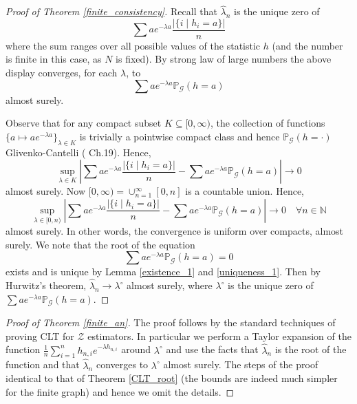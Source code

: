 \documentclass[12pt]{article}
\numberwithin{equation}{section}
\begin{document}
\begin{proof}[Proof of Theorem \ref{finite_consistency}]
Recall that $\hat{\lambda}_n$ is the unique zero of
\[
\sum a e^{-\lambda a}\frac{\lvert\{i\mid h_i=a\}\rvert}{n}
\]
where the sum ranges over all possible values of the statistic $h$ (and the number is finite in this case, as $N$ is fixed). By strong law of large numbers the above display converges, for each $\lambda$, to
\[
\sum a e^{-\lambda a}\mathbb{P}_{\mathcal{G}}(h=a)
\]
almost surely. 

Observe that for any compact subset $K\subseteq [0,\infty)$, the collection of functions $\{a\mapsto a e^{-\lambda a}\}_{\lambda\in K}$ is trivially a pointwise compact class and hence $\mathbb{P}_{\mathcal{G}}(h=\cdot)$ Glivenko-Cantelli (\cite{Vaart1998} Ch.19). Hence,
\[
\sup\limits_{\lambda\in K}^{} \left\lvert \sum a e^{-\lambda a}\frac{\lvert\{i\mid h_i=a\}\rvert}{n} - \sum a e^{-\lambda a}\mathbb{P}_{\mathcal{G}}(h=a)\right\rvert \rightarrow 0
\]
almost surely. Now $[0,\infty)=\cup_{n=1}^\infty [0,n]$ is a countable union. Hence,
\[
\sup\limits_{\lambda\in [0,n)}^{} \left\lvert \sum a e^{-\lambda a}\frac{\lvert\{i\mid h_i=a\}\rvert}{n} - \sum a e^{-\lambda a}\mathbb{P}_{\mathcal{G}}(h=a)\right\rvert \rightarrow 0 \quad \forall n\in\mathbb{N}
\]
almost surely. In other words, the convergence is uniform over compacts, almost surely.
We note that the root of the equation \[\sum a e^{-\lambda a}\mathbb{P}_{\mathcal{G}}(h=a)=0
\]
exists and is unique by Lemma \ref{existence_1} and \ref{uniqueness_1}.
Then by Hurwitz's theorem, $\hat{\lambda}_n\rightarrow \lambda^{\circ}$ almost surely, where $\lambda^{\circ}$ is the unique zero of $\sum a e^{-\lambda a}\mathbb{P}_{\mathcal{G}}(h=a)$.
\end{proof}

\begin{proof}[Proof of Theorem \ref{finite_an}]
The proof follows by the standard techniques of  proving CLT for $\mathcal{Z}$ estimators. In particular we perform a Taylor expansion of the function $\frac{1}{n}\sum_{i=1}^n h_{n,i} e^{-\lambda h_{n,i}}$ around $\lambda^{\circ}$ and use the facts that $\hat{\lambda}_n$ is the root of the function and that $\hat{\lambda}_n$ converges to $\lambda^{\circ}$ almost surely. The steps of the proof identical to that of Theorem \ref{CLT_root} (the bounds are indeed much simpler for the finite graph) and hence we omit the details.
\end{proof}
\end{document}
